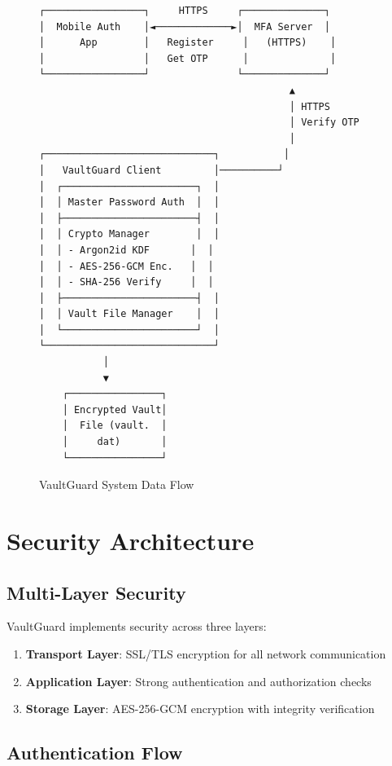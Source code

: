 \documentclass[12pt,a4paper]{report}
\begin{document}
\begin{figure}[H]
\centering
\begin{verbatim}
┌─────────────────┐     HTTPS     ┌──────────────┐
│  Mobile Auth    │◄─────────────►│  MFA Server  │
│      App        │   Register     │   (HTTPS)    │
│                 │   Get OTP      │              │
└─────────────────┘               └──────────────┘
                                           ▲
                                           │ HTTPS
                                           │ Verify OTP
                                           │
┌─────────────────────────────┐           │
│   VaultGuard Client         │──────────┘
│  ┌───────────────────────┐  │
│  │ Master Password Auth  │  │
│  ├───────────────────────┤  │
│  │ Crypto Manager        │  │
│  │ - Argon2id KDF       │  │
│  │ - AES-256-GCM Enc.   │  │
│  │ - SHA-256 Verify     │  │
│  ├───────────────────────┤  │
│  │ Vault File Manager    │  │
│  └───────────────────────┘  │
└─────────────────────────────┘
           │
           ▼
    ┌────────────────┐
    │ Encrypted Vault│
    │  File (vault.  │
    │     dat)       │
    └────────────────┘
\end{verbatim}
\caption{VaultGuard System Data Flow}
\end{figure}

\section{Security Architecture}

\subsection{Multi-Layer Security}

VaultGuard implements security across three layers:

\begin{enumerate}
    \item \textbf{Transport Layer}: SSL/TLS encryption for all network communication
    \item \textbf{Application Layer}: Strong authentication and authorization checks
    \item \textbf{Storage Layer}: AES-256-GCM encryption with integrity verification
\end{enumerate}

\subsection{Authentication Flow}
\end{document}
